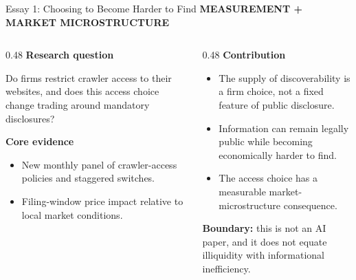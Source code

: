 \documentclass[aspectratio=169,10pt]{beamer}
\newcommand{\eyebrow}[1]{%
  {\color{accent}\fontsize{7.3}{9}\selectfont\bfseries\MakeUppercase{#1}}\par\vspace{0.10cm}%
}
\newcommand{\smallhead}[1]{%
  {\fontsize{11}{13}\selectfont\bfseries #1}\par\vspace{0.08cm}%
}
\newcommand{\bodytext}{\fontsize{9.4}{12.1}\selectfont}
\newcommand{\smalltext}{\fontsize{8.1}{10.2}\selectfont}
\begin{document}
\begin{frame}[t]{Essay 1: Choosing to Become Harder to Find}
\eyebrow{Measurement + market microstructure}

\begin{columns}[T,onlytextwidth]
  \begin{column}{0.48\textwidth}
    \smallhead{Research question}
    {\bodytext Do firms restrict crawler access to their websites, and does this access choice change trading around mandatory disclosures?}\par
    \vspace{0.22cm}
    \smallhead{Core evidence}
    {\bodytext
    \begin{itemize}\setlength\itemsep{0.12cm}
      \item New monthly panel of crawler-access policies and staggered switches.
      \item Filing-window price impact relative to local market conditions.
    \end{itemize}}
  \end{column}
  \begin{column}{0.48\textwidth}
    \smallhead{Contribution}
    {\bodytext
    \begin{itemize}\setlength\itemsep{0.12cm}
      \item The supply of discoverability is a firm choice, not a fixed feature of public disclosure.
      \item Information can remain legally public while becoming economically harder to find.
      \item The access choice has a measurable market-microstructure consequence.
    \end{itemize}}
    \vspace{0.14cm}
    \colorbox{panel}{\parbox{0.93\linewidth}{\smalltext\textbf{Boundary:} this is not an AI paper, and it does not equate illiquidity with informational inefficiency.}}
  \end{column}
\end{columns}

\end{frame}
\end{document}
